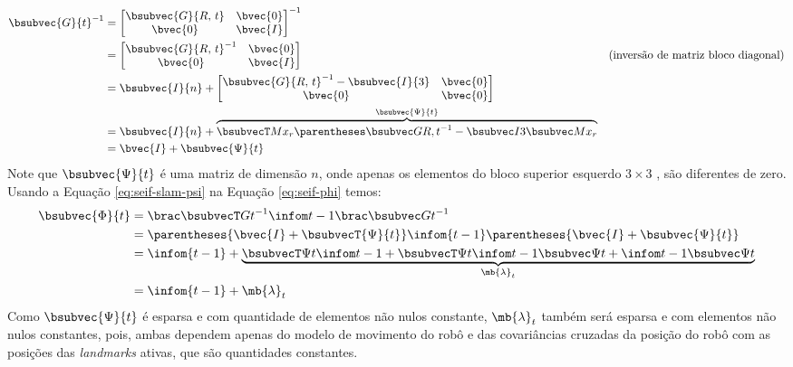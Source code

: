 \begin{equation}
\begin{aligned}
  \bsubvec{G}{t}^{-1} &= \begin{bmatrix}
    \bsubvec{G}{R, \,t} & \bvec{0} \\
    \bvec{0} & \bvec{I}
  \end{bmatrix}^{-1} \\
  &= \begin{bmatrix}
    \bsubvec{G}{R, \,t}^{-1} & \bvec{0} \\
    \bvec{0} & \bvec{I} 
  \end{bmatrix} & \text{(inversão de matriz bloco diagonal)} \\
  &= \bsubvec{I}{n} + \begin{bmatrix}
    \bsubvec{G}{R, \,t}^{-1} - \bsubvec{I}{3} & \bvec{0} \\
    \bvec{0} & \bvec{0}
  \end{bmatrix} \\
  &= \bsubvec{I}{n} + \overbrace{\psitvalue}^{\bsubvec{\Psi}{t}} \\
  &= \bvec{I} + \bsubvec{\Psi}{t} 
\end{aligned}
\label{eq:seif-slam-psi}
\end{equation}
Note que $\bsubvec{\Psi}{t}$ é uma matriz de dimensão $n$, onde apenas os 
elementos do bloco superior esquerdo $3\times 3$ , são diferentes de zero. Usando a Equação \ref{eq:seif-slam-psi} na Equação \ref{eq:seif-phi} temos:
\begin{equation}
\begin{aligned}
  \bsubvec{\Phi}{t} &= \seifPhi \\
  &= \parentheses{\bvec{I} + \bsubvecT{\Psi}{t}} \infom{t-1} \parentheses{\bvec{I} + \bsubvec{\Psi}{t}} \\
  &= \infom{t-1} + \underbrace{\lambdatvalue}_{\mb{\lambda}_t} \\
  &= \infom{t-1} + \mb{\lambda}_t
\end{aligned}
\end{equation}
Como $\bsubvec{\Psi}{t}$ é esparsa e com quantidade de elementos não nulos 
constante, $\mb{\lambda}_t$ também será esparsa e com elementos não nulos 
constantes, pois, ambas dependem apenas do modelo de movimento do robô e das 
covariâncias cruzadas da posição do robô com as posições das 
\textit{landmarks} ativas, que são quantidades constantes.


